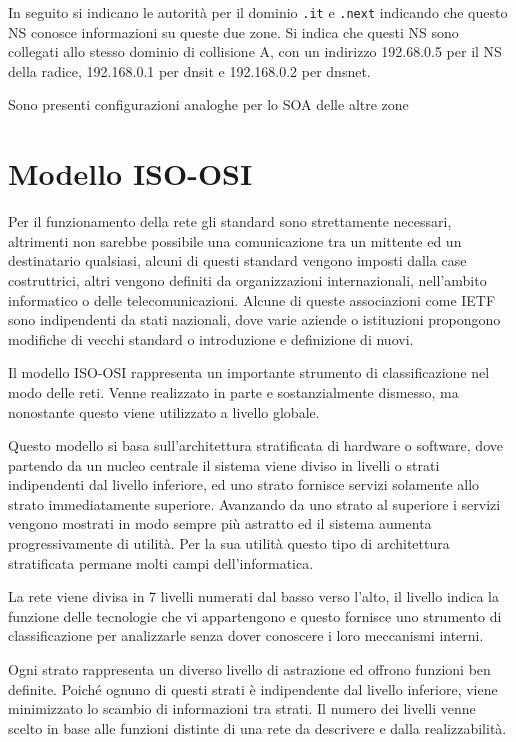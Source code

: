 \documentclass{article}
\numberwithin{equation}{subsection}
\begin{document}
In seguito si indicano le autorità per il dominio \texttt{.it} e \texttt{.next} indicando che questo NS conosce informazioni su queste due zone. 
Si indica che questi NS sono collegati allo stesso dominio di collisione A, con un indirizzo 192.68.0.5 per il NS della radice, 192.168.0.1 per 
dnsit e 192.168.0.2 per dnsnet. 

Sono presenti configurazioni analoghe per lo SOA delle altre zone %




\clearpage

\section{Modello ISO-OSI}

Per il funzionamento della rete gli standard sono strettamente necessari, altrimenti non sarebbe possibile una comunicazione tra un mittente ed un destinatario qualsiasi, 
alcuni di questi standard vengono imposti dalla case costruttrici, altri vengono definiti da organizzazioni internazionali, nell'ambito informatico o delle 
telecomunicazioni. Alcune di queste associazioni come IETF sono indipendenti da stati nazionali, dove varie aziende o istituzioni propongono modifiche di vecchi 
standard o introduzione e definizione di nuovi. 

Il modello ISO-OSI rappresenta un importante strumento di classificazione nel modo delle reti. Venne realizzato in parte e sostanzialmente dismesso, ma nonostante 
questo viene utilizzato a livello globale. 

Questo modello si basa sull'architettura stratificata di hardware o software, dove partendo da un nucleo centrale il sistema viene diviso in livelli o strati 
indipendenti dal livello inferiore, ed uno strato fornisce servizi solamente allo strato immediatamente superiore. Avanzando da uno strato al superiore i servizi vengono mostrati in modo 
sempre più astratto ed il sistema aumenta progressivamente di utilità. Per la sua utilità questo tipo di architettura stratificata permane molti campi dell'informatica. 

La rete viene divisa in 7 livelli numerati dal basso verso l'alto, il livello indica la funzione delle tecnologie che vi appartengono e questo fornisce uno strumento di 
classificazione per analizzarle senza dover conoscere i loro meccanismi interni. 


Ogni strato rappresenta un diverso livello di astrazione ed offrono funzioni ben definite. Poiché ognuno di questi strati è indipendente dal livello inferiore, viene minimizzato lo scambio 
di informazioni tra strati. Il numero dei livelli venne scelto in base alle funzioni distinte di una rete da descrivere e dalla realizzabilità. 
\end{document}
